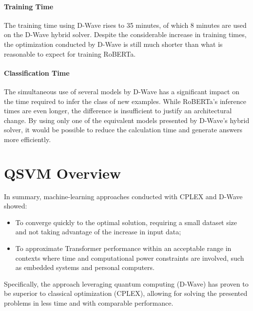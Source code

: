 \paragraph{Training Time} The training time using D-Wave rises to 35 minutes, of which 8 minutes are used on the D-Wave hybrid solver. 
Despite the considerable increase in training times, the optimization conducted by D-Wave is still much shorter than what is reasonable to expect for training RoBERTa.

\paragraph{Classification Time} The simultaneous use of several models by D-Wave has a significant impact on the time required to infer the class of new examples. While RoBERTa's inference times are even longer, the difference is insufficient to justify an architectural change. By using only one of the equivalent models presented by D-Wave's hybrid solver, it would be possible to reduce the calculation time and generate answers more efficiently.

\section{QSVM Overview}

In summary, machine-learning approaches conducted with CPLEX and D-Wave showed:
\begin{itemize}
    \item To converge quickly to the optimal solution, requiring a small dataset size and not taking advantage of the increase in input data;
    \item To approximate Transformer performance within an acceptable range in contexts where time and computational power constraints are involved, such as embedded systems and personal computers.
\end{itemize}

Specifically, the approach leveraging quantum computing (D-Wave) has proven to be superior to classical optimization (CPLEX), allowing for solving the presented problems in less time and with comparable performance.
